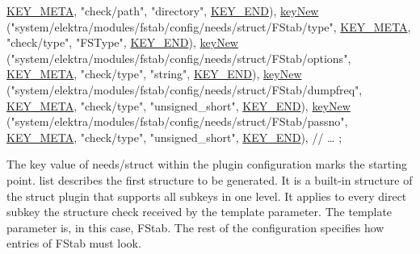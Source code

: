 \begin{DoxyCode}
    \hyperlink{group__key_gga91fb3178848bd682000958089abbaf40a040582834bb2d90049947d7ef74e87e2}{KEY\_META}, \textcolor{stringliteral}{"check/path"}, \textcolor{stringliteral}{"directory"},
    \hyperlink{group__key_gga91fb3178848bd682000958089abbaf40aa8adb6fcb92dec58fb19410eacfdd403}{KEY\_END}),
\hyperlink{group__key_gad23c65b44bf48d773759e1f9a4d43b89}{keyNew} (\textcolor{stringliteral}{"system/elektra/modules/fstab/config/needs/struct/FStab/type"},
    \hyperlink{group__key_gga91fb3178848bd682000958089abbaf40a040582834bb2d90049947d7ef74e87e2}{KEY\_META}, \textcolor{stringliteral}{"check/type"}, \textcolor{stringliteral}{"FSType"},
    \hyperlink{group__key_gga91fb3178848bd682000958089abbaf40aa8adb6fcb92dec58fb19410eacfdd403}{KEY\_END}),
\hyperlink{group__key_gad23c65b44bf48d773759e1f9a4d43b89}{keyNew} (\textcolor{stringliteral}{"system/elektra/modules/fstab/config/needs/struct/FStab/options"},
    \hyperlink{group__key_gga91fb3178848bd682000958089abbaf40a040582834bb2d90049947d7ef74e87e2}{KEY\_META}, \textcolor{stringliteral}{"check/type"}, \textcolor{stringliteral}{"string"},
    \hyperlink{group__key_gga91fb3178848bd682000958089abbaf40aa8adb6fcb92dec58fb19410eacfdd403}{KEY\_END}),
\hyperlink{group__key_gad23c65b44bf48d773759e1f9a4d43b89}{keyNew} (\textcolor{stringliteral}{"system/elektra/modules/fstab/config/needs/struct/FStab/dumpfreq"},
    \hyperlink{group__key_gga91fb3178848bd682000958089abbaf40a040582834bb2d90049947d7ef74e87e2}{KEY\_META}, \textcolor{stringliteral}{"check/type"}, \textcolor{stringliteral}{"unsigned\_short"},
    \hyperlink{group__key_gga91fb3178848bd682000958089abbaf40aa8adb6fcb92dec58fb19410eacfdd403}{KEY\_END}), \hyperlink{group__key_gad23c65b44bf48d773759e1f9a4d43b89}{keyNew} (\textcolor{stringliteral}{"system/elektra/modules/fstab/config/needs/struct/FStab/passno"},
    \hyperlink{group__key_gga91fb3178848bd682000958089abbaf40a040582834bb2d90049947d7ef74e87e2}{KEY\_META}, \textcolor{stringliteral}{"check/type"}, \textcolor{stringliteral}{"unsigned\_short"},
    \hyperlink{group__key_gga91fb3178848bd682000958089abbaf40aa8adb6fcb92dec58fb19410eacfdd403}{KEY\_END}),
\textcolor{comment}{// …}
;
\end{DoxyCode}


The key value of {\ttfamily needs/struct} within the plugin configuration marks the starting point. {\ttfamily list} describes the first structure to be generated. It is a built-\/in structure of the struct plugin that supports all subkeys in one level. It applies to every direct subkey the structure check received by the template parameter. The template parameter is, in this case, F\+Stab. The rest of the configuration specifies how entries of F\+Stab must look.

